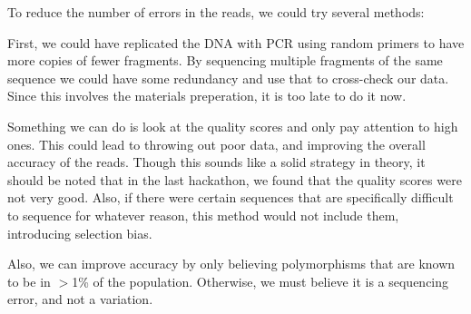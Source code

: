 To reduce the number of errors in the reads, we could try several methods:

First, we could have replicated the DNA with PCR using random primers to have more copies of
fewer fragments. By sequencing multiple fragments of the same sequence we could have some redundancy and 
use that to cross-check our data.  Since this involves the materials preperation, it is too late to do it now.

Something we can do is look at the quality scores and only pay attention to high ones.
This could lead to throwing out poor data, and improving the overall accuracy
of the reads. Though this sounds like a solid strategy in theory, it should be
noted that in the last hackathon, we found that the quality scores were not
very good. Also, if there were certain sequences that are specifically difficult to sequence
for whatever reason, this method would not include them, introducing selection bias.

Also, we can improve accuracy by only believing polymorphisms that are known 
to be in $>$1\% of the population. Otherwise, we must believe it is a sequencing error, and
not a variation. 
